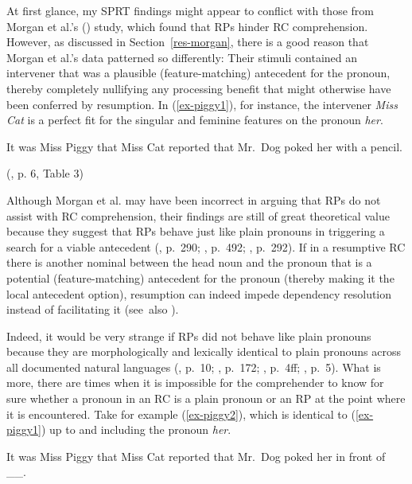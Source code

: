At first glance, my SPRT findings might appear to conflict with those from Morgan et al.'s (\citeyear{morgan.etal2020}) study, which found that RPs hinder RC comprehension.\footnotemark{} However, as discussed in Section~\ref{res-morgan}, there is a good reason that Morgan et al.'s data patterned so differently: Their stimuli contained an intervener that was a plausible (feature-matching) antecedent for the pronoun, thereby completely nullifying any processing benefit that might otherwise have been conferred by resumption. In (\ref{ex-piggy1}), for instance, the intervener \textit{Miss Cat} is a perfect fit for the singular and feminine features on the pronoun \textit{her}. 


\ex\label{ex-piggy1} 
\ljudge*It was Miss Piggy that Miss Cat reported that Mr.~Dog poked her with a pencil.\par\nobreak\vspace{5pt}
\hfill (\cite{morgan.etal2020}, p. 6, Table 3)
\xe 

Although Morgan et al. may have been incorrect in arguing that RPs do not assist with RC comprehension, their findings are still of great theoretical value because they suggest that RPs behave just like plain pronouns in triggering a search for a viable antecedent (\cite{doron2011}, p.~290; \cite{prince1990}, p.~492; \cite{sells1987}, p.~292). If in a resumptive RC there is another nominal between the head noun and the pronoun that is a potential (feature-matching) antecedent for the pronoun (thereby making it the local antecedent option), resumption can indeed impede dependency resolution instead of facilitating it (see~also \cite{keshev.etal2019}).

Indeed, it would be very strange if RPs did not behave like plain pronouns because they are morphologically and lexically identical to plain pronouns across all documented natural languages (\cite{asudeh2015}, p.~10; \cite{engdahl1982}, p.~172; \cite{hewett2023}, p.~4ff; \cite{mccloskey2017}, p.~5). What is more, there are times when it is impossible for the comprehender to know for sure whether a pronoun in an RC is a plain pronoun or an RP at the point where it is encountered. Take for example (\ref{ex-piggy2}), which is identical to (\ref{ex-piggy1}) up to and including the pronoun \textit{her}.

\ex\label{ex-piggy2}
It was Miss Piggy that Miss Cat reported that Mr.~Dog poked her in front of \_\_.
\xe 

